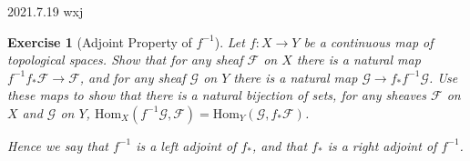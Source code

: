\documentclass[12pt]{amsart}
\newtheorem{exe}{Exercise}[subsection]
\begin{document}
2021.7.19 wxj

\begin{exe}[Adjoint Property of $f^{-1}$]
	\label{2.1.18}
   Let $f: X \rightarrow Y$ be a continuous map of topological spaces. Show that for any sheaf $\mathscr{F}$ on $X$ there is a natural map $f^{-1}f_{*}\mathscr{F} \rightarrow \mathscr{F}$, and for any sheaf $\mathscr{G}$ on $Y$ there is a natural map $\mathscr{G} \rightarrow f_{*}f^{-1}\mathscr{G}$. Use these maps to show that there is a natural bijection of sets, for any sheaves $\mathscr{F}$ on $X$ and $\mathscr{G}$ on $Y$, $\mathrm{Hom}_{X}(f^{-1}\mathscr{G}, \mathscr{F}) = \mathrm{Hom}_{Y}(\mathscr{G}, f_{*}\mathscr{F})$.
   
   Hence we say that $f^{-1}$ is a left adjoint of $f_{*}$, and that $f_{*}$ is a right adjoint of $f^{-1}$.
\end{exe}
\end{document}
